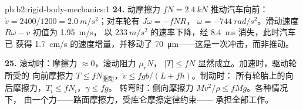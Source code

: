 \begin{solution}{pb:b2:rigid-body-mechanics:1}
\textbf{24.} 动摩擦力 $fN = \qty{2.4}{kN}$ 推动汽车向前：
$\dot v = 2400/1200 = \qty{2.0}{m/s^2}$；对车轮有 $J\dot\omega = -fNR$，
$\dot\omega = \qty{-744}{rad/s^2}$。滑动速度 $R\omega - v$ 初值为 \qty{1.95}{m/s}，
以 $\qty{233}{m/s^2}$ 的速率下降，经 \qty{8.4}{ms} 消失，此时汽车已
获得 \qty{1.7}{cm/s} 的速度增量，并移动了 \qty{70}{\micro m}——这是一次冲击，而非推动。

\textbf{25.} 滚动时：摩擦力 $\approx 0$，滚动阻力 $\mu_rN$，
$|T| \le fN$ 显然成立。加速时，驱动轮所受的
向前摩擦力 $T \le fN_{\text{驱动}}$，$\dot v \le fgb/(L + fh)$。制动时：
所有轮胎上的向后摩擦力，$T_i \le fN_i$，$\gamma \le fg$。
转弯时：侧向摩擦力 $Mv^2/\rho \le fMg$。各种情况下，
由一个力——路面摩擦力，受库仑摩擦定律约束——
承担全部工作。
\end{solution}
